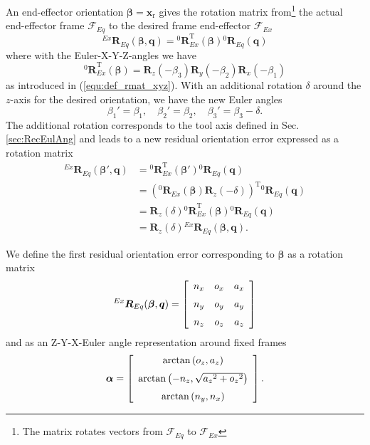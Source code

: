 \documentclass[twocolumn,10pt]{IFTOMM}
\newcommand{\bm}[1]{\boldsymbol{#1}}
\newcommand{\rotmat}[2]{{{ }^{#1}\boldsymbol{R}}_{#2}}
\newcommand{\transp}[0]{{\mathrm{T}}}
\newcommand{\ks}[1]{{\mathcal{F}}_{#1}}
\begin{document}
An end-effector orientation $\bm{\beta}=\bm{x}_{\mathrm{r}}$ gives the rotation matrix from\footnote{The matrix rotates vectors from $\ks{Eq}$ to $\ks{Ex}$} the actual end-effector frame $\ks{Eq}$ to the desired frame end-effector $\ks{Ex}$
%
\begin{equation}
\rotmat{Ex}{Eq}(\bm{\beta},\bm{q})
= 
\rotmat{0}{Ex}^\transp (\bm{\beta})\rotmat{0}{Eq}(\bm{q})
\end{equation}
%
where with the Euler-X-Y-Z-angles we have
%
\begin{equation}
\rotmat{0}{Ex}^\transp(\bm{\beta})
=
\bm{R}_z(-\beta_3) \bm{R}_y(-\beta_2) \bm{R}_x(-\beta_1)
\end{equation}
%
as introduced in (\ref{equ:def_rmat_xyz}).
With an additional rotation $\delta$ around the $z$-axis for the desired orientation, we have the new Euler angles
%
\begin{equation}
\beta_1'=\beta_1,  \quad \beta_2'=\beta_2,  \quad \beta_3'=\beta_3-\delta.
\end{equation}
%
The additional rotation corresponds to the tool axis defined in Sec.\,\ref{sec:RecEulAng} %
and leads to a new residual orientation error expressed as a rotation matrix
%
\begin{align}
\rotmat{Ex}{Eq}(\bm{\beta}',\bm{q})
&=
\rotmat{0}{Ex}^\transp (\bm{\beta}') \rotmat{0}{Eq}(\bm{q}) \nonumber\\
&=
\left(\rotmat{0}{Ex}(\bm{\beta})\bm{R}_z(-\delta)\right)^\transp \rotmat{0}{Eq}(\bm{q}) \nonumber \\
&=
\bm{R}_z(\delta) \rotmat{0}{Ex}^\transp (\bm{\beta}) \rotmat{0}{Eq}(\bm{q}) \nonumber \\
&=
\bm{R}_z(\delta) \rotmat{Ex}{Eq}(\bm{\beta},\bm{q}).
\end{align}

We define the first residual orientation error corresponding to $\bm{\beta}$ as a rotation matrix
%
\begin{align}
\rotmat{Ex}{Eq}(\bm{\beta},\bm{q})
=\left[ \begin {array}{ccc} {n_x}&{o_x}&{a_x} \\ \noalign{\medskip}{n_y}&{o_y}&{a_y}\\ \noalign{\medskip}{ n_z}&{o_z}&{a_z}\end {array} \right] 
\end{align}
%
and as an Z-Y-X-Euler angle representation around fixed frames
%
\begin{align}
\bm{\alpha} =
\left[ \begin {array}{c} \arctan \left( {o_z},{a_z} \right)  \\ \noalign{\medskip}\arctan \left( -{n_z},\sqrt {{{a_z}}^{2}+{{ o_z}}^{2}} \right) \\ \noalign{\medskip}\arctan \left( {n_y},{ n_x} \right) \end {array} \right].
\label{equ:alpha_xyz}
\end{align}
\end{document}
